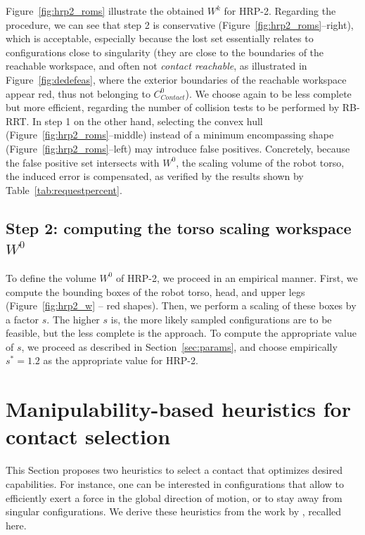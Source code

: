 \documentclass[journal]{IEEEtran}
\newcommand{\gls}[1]{\textit{#1}}
\begin{document}
Figure~\ref{fig:hrp2_roms} illustrate the obtained $W^k$ for HRP-2.
Regarding the procedure, we can see that step 2 is conservative (Figure~\ref{fig:hrp2_roms}--right), which 
is acceptable, especially because the lost set essentially relates to configurations close to singularity (they are close to the boundaries of the reachable workspace, and
often not \gls{contact reachable}, as illustrated in Figure~\ref{fig:dedefeas}, where the exterior boundaries of the reachable workspace appear
red, thus not belonging to $C_{Contact}^0$). We choose again to be less complete but more efficient, regarding the number of collision tests to be performed by RB-RRT.
In step 1 on the other hand, selecting the convex hull (Figure~\ref{fig:hrp2_roms}--middle) instead of a minimum encompassing shape (Figure~\ref{fig:hrp2_roms}--left) may introduce false positives.
Concretely, because the false positive set intersects with $W^0$, the scaling volume of the robot torso, the induced error is compensated,
as verified by the results shown by Table~\ref{tab:requestpercent}.

\subsection{Step 2: computing the torso scaling workspace $W^0$}
To define the volume $W^0$ of HRP-2, we proceed in an empirical manner.
First, we compute the bounding boxes of the robot torso, head, and upper legs (Figure~\ref{fig:hrp2_w} -- red shapes).
Then, we perform a scaling of these boxes by a factor $s$. 
The higher $s$ is, the more likely sampled configurations are to be feasible, but the less complete is the approach.
To compute the appropriate value of $s$, we proceed as described in Section~\ref{sec:params}, and choose empirically
$s^*=1.2$ as the appropriate value for HRP-2.
\section{Manipulability-based heuristics for contact selection}
\label{sec:heuristics}
This Section proposes two heuristics to select a contact that optimizes desired capabilities.
For instance, one can be interested in configurations that allow to efficiently exert a force in the global direction of motion, or to stay away from singular configurations.
We derive these heuristics from the work by \cite{Yoshikawa1984}, recalled here. %
\end{document}
